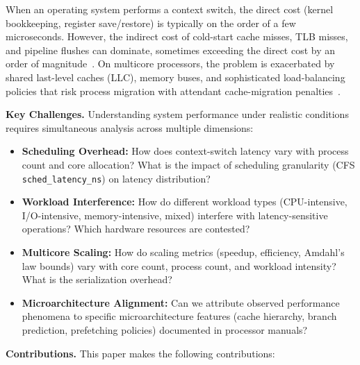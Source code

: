 \documentclass[conference]{IEEEtran}
\begin{document}
When an operating system performs a context switch, the direct cost (kernel
bookkeeping, register save/restore) is typically on the order of a few
microseconds. However, the indirect cost of cold-start cache misses, TLB
misses, and pipeline flushes can dominate, sometimes exceeding the direct cost
by an order of magnitude~\cite{li2007quantifying}. On multicore processors,
the problem is exacerbated by shared last-level caches (LLC), memory buses,
and sophisticated load-balancing policies that risk process migration with
attendant cache-migration penalties~\cite{lozi2016linux}.

\textbf{Key Challenges.}
Understanding system performance under realistic conditions requires
simultaneous analysis across multiple dimensions:

\begin{itemize}
  \item \textbf{Scheduling Overhead:} How does context-switch latency vary with
        process count and core allocation? What is the impact of scheduling
        granularity (CFS \texttt{sched\_latency\_ns}) on latency distribution?
  
  \item \textbf{Workload Interference:} How do different workload types
        (CPU-intensive, I/O-intensive, memory-intensive, mixed) interfere with
        latency-sensitive operations? Which hardware resources are contested?
  
  \item \textbf{Multicore Scaling:} How do scaling metrics (speedup, efficiency,
        Amdahl's law bounds) vary with core count, process count, and workload
        intensity? What is the serialization overhead?
  
  \item \textbf{Microarchitecture Alignment:} Can we attribute observed
        performance phenomena to specific microarchitecture features (cache
        hierarchy, branch prediction, prefetching policies) documented in
        processor manuals?
\end{itemize}

\textbf{Contributions.}
This paper makes the following contributions:
\end{document}
